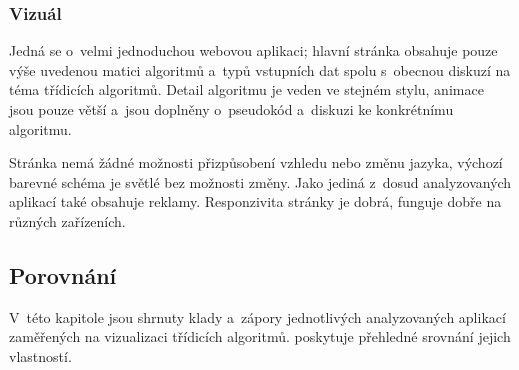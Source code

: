 \subsubsection*{Vizuál}

Jedná se o~velmi jednoduchou webovou aplikaci; hlavní stránka obsahuje pouze výše uvedenou matici algoritmů a~typů vstupních dat spolu s~obecnou diskuzí na téma třídicích algoritmů.
Detail algoritmu je veden ve stejném stylu, animace jsou pouze větší a~jsou doplněny o~pseudokód a~diskuzi ke konkrétnímu algoritmu.

Stránka nemá žádné možnosti přizpůsobení vzhledu nebo změnu jazyka, výchozí barevné schéma je světlé bez možnosti změny.
Jako jediná z~dosud analyzovaných aplikací také obsahuje reklamy.
Responzivita stránky je dobrá, funguje dobře na různých zařízeních.

\subsection{Porovnání}
\label{subsec:other_apps_sa_comparison}

V~této kapitole jsou shrnuty klady a~zápory jednotlivých analyzovaných aplikací zaměřených na vizualizaci třídicích algoritmů.
 poskytuje přehledné srovnání jejich vlastností.

\begin{table}[H]
    \centering
    \caption{Porovnání analyzovaných aplikací pro vizualizaci algoritmů}
    \label{tab:other_apps_sa_comparison}
\end{table}

